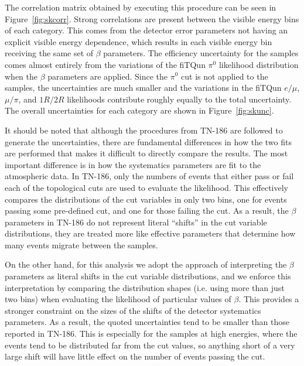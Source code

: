 The correlation matrix obtained by executing this procedure can be seen
in Figure~\ref{fig:skcorr}.  Strong correlations are present between the
visible energy bins of each category.  This comes from the detector error
parameters not having an explicit visible energy dependence, which results in
each visible energy bin receiving the same set of $\beta$ parameters.  The
efficiency uncertainty for the \nue samples comes almost entirely from the
variations of the fiTQun $\pi^{0}$ likelihood distribution when the $\beta$
parameters are applied.  Since the $\pi^{0}$ cut is not applied to the \numu
samples, the \numu uncertainties are much smaller and the variations
in the fiTQun $e/\mu$, $\mu/\pi$, and $1R/2R$ likelihoods contribute roughly equally to the
total uncertainty.  The overall
uncertainties for each category are shown in Figure~\ref{fig:skunc}.

It should be noted that although the procedures from TN-186 are followed to
generate the uncertainties, there are fundamental differences in how the two
fits are performed that makes it difficult to directly compare the results.
The most important difference is in how the systematics parameters are fit to
the atmospheric data.  In TN-186, only the numbers of events that either pass
or fail each of the topological cuts are used to evaluate the likelihood.  This
effectively compares the distributions of the cut variables in only two bins,
one for events passing some pre-defined cut, and one for those failing the cut.
As a result, the $\beta$ parameters in TN-186 do not represent literal
``shifts'' in the cut variable distributions, they are treated more like
effective parameters that determine how many events migrate between the
samples. 

On the other hand, for this analysis we adopt the approach of interpreting the
$\beta$ parameters as literal shifts in the cut variable distributions, and we
enforce this interpretation by comparing the distribution shapes (i.e. using
more than just two bins) when evaluating the likelihood of particular values of
$\beta$.  This provides a stronger constraint on the sizes of the shifts of the
detector systematics parameters.  As a result, the quoted uncertainties tend to
be smaller than those reported in TN-186.  This is especially for the \Pnum
samples at high energies, where the events tend to be distributed far from the
cut values, so anything short of a very large shift will have little effect on
the number of events passing the cut.

